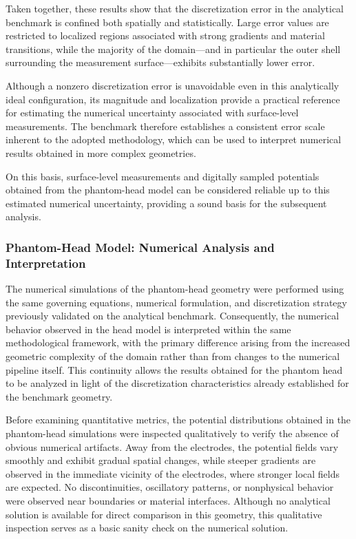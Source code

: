 \documentclass[../00_Main.tex]{subfiles}
\begin{document}
Taken together, these results show that the discretization error in the analytical benchmark is confined both spatially and statistically. Large error values are restricted to localized regions associated with strong gradients and material transitions, while the majority of the domain---and in particular the outer shell surrounding the measurement surface---exhibits substantially lower error.

Although a nonzero discretization error is unavoidable even in this analytically ideal configuration, its magnitude and localization provide a practical reference for estimating the numerical uncertainty associated with surface-level measurements. The benchmark therefore establishes a consistent error scale inherent to the adopted methodology, which can be used to interpret numerical results obtained in more complex geometries.

On this basis, surface-level measurements and digitally sampled potentials obtained from the phantom-head model can be considered reliable up to this estimated numerical uncertainty, providing a sound basis for the subsequent analysis.

\subsubsection{Phantom-Head Model: Numerical Analysis and Interpretation}
The numerical simulations of the phantom-head geometry were performed using the same governing equations, numerical formulation, and discretization strategy previously validated on the analytical benchmark. Consequently, the numerical behavior observed in the head model is interpreted within the same methodological framework, with the primary difference arising from the increased geometric complexity of the domain rather than from changes to the numerical pipeline itself. This continuity allows the results obtained for the phantom head to be analyzed in light of the discretization characteristics already established for the benchmark geometry.

Before examining quantitative metrics, the potential distributions obtained in the phantom-head simulations were inspected qualitatively to verify the absence of obvious numerical artifacts. Away from the electrodes, the potential fields vary smoothly and exhibit gradual spatial changes, while steeper gradients are observed in the immediate vicinity of the electrodes, where stronger local fields are expected. No discontinuities, oscillatory patterns, or nonphysical behavior were observed near boundaries or material interfaces. Although no analytical solution is available for direct comparison in this geometry, this qualitative inspection serves as a basic sanity check on the numerical solution.
\end{document}
